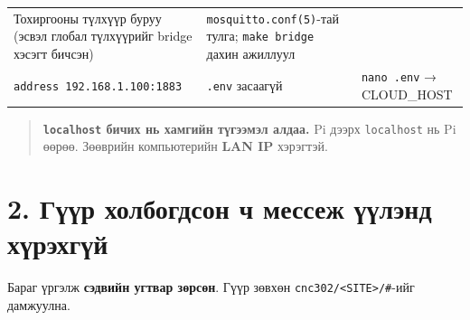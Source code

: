\begin{longtable}[]{@{}lll@{}}
\begin{minipage}[t]{0.30\columnwidth}
Тохиргооны түлхүүр буруу (эсвэл глобал түлхүүрийг bridge хэсэгт бичсэн)\strut
\end{minipage} & \begin{minipage}[t]{0.30\columnwidth}\raggedright
\texttt{mosquitto.\allowbreak{}conf(5)}-тай тулга; \texttt{make\ bridge} дахин ажиллуул\strut
\end{minipage}\tabularnewline
\begin{minipage}[t]{0.30\columnwidth}\raggedright
\texttt{address\ 192.\allowbreak{}168.\allowbreak{}1.\allowbreak{}100:\allowbreak{}1883}\strut
\end{minipage} & \begin{minipage}[t]{0.30\columnwidth}\raggedright
\texttt{.env} засаагүй\strut
\end{minipage} & \begin{minipage}[t]{0.30\columnwidth}\raggedright
\texttt{nano\ .env} → CLOUD\_HOST\strut
\end{minipage}\tabularnewline
\bottomrule
\end{longtable}\endgroup

\begin{quote}
\textbf{\texttt{localhost} бичих нь хамгийн түгээмэл алдаа.} Pi дээрх \texttt{localhost} нь Pi өөрөө. Зөөврийн компьютерийн \textbf{LAN IP} хэрэгтэй.
\end{quote}

\hypertarget{ux433ux4afux4afux440-ux445ux43eux43bux431ux43eux433ux434ux441ux43eux43d-ux447-ux43cux435ux441ux441ux435ux436-ux4afux4afux43bux44dux43dux434-ux445ux4afux440ux44dux445ux433ux4afux439}{%
\section{2. Гүүр холбогдсон ч мессеж үүлэнд хүрэхгүй}\label{ux433ux4afux4afux440-ux445ux43eux43bux431ux43eux433ux434ux441ux43eux43d-ux447-ux43cux435ux441ux441ux435ux436-ux4afux4afux43bux44dux43dux434-ux445ux4afux440ux44dux445ux433ux4afux439}}

Бараг үргэлж \textbf{сэдвийн угтвар зөрсөн}. Гүүр зөвхөн \texttt{cnc302/\allowbreak{}\textless{}SITE\textgreater{}/\allowbreak{}\#}-ийг дамжуулна.

\begin{Shaded}
\begin{Highlighting}[]
 


\StringTok{\textquotesingle{}\#\textquotesingle{}}
\end{Highlighting}
\end{Shaded}

